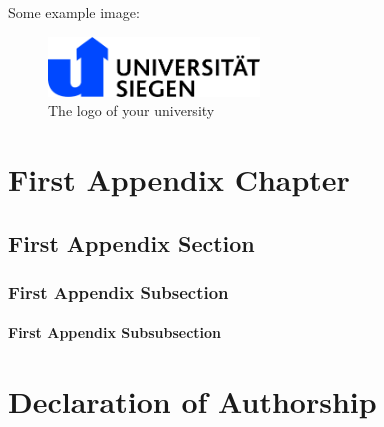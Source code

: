 \documentclass[
thesis  %
]{csthes}
\begin{document}
Some example image:
\begin{figure}[hb!]
\centering
  \includegraphics[width=0.5\textwidth]{images/logos/uni_siegen_logo}
    \caption{The logo of your university}
\end{figure}


\appendix
\chapter{First Appendix Chapter}
\section{First Appendix Section}
\subsection{First Appendix Subsection}
\subsubsection{First Appendix Subsubsection}

\cleardoublepage



\chapter*{Declaration of Authorship}
\end{document}
